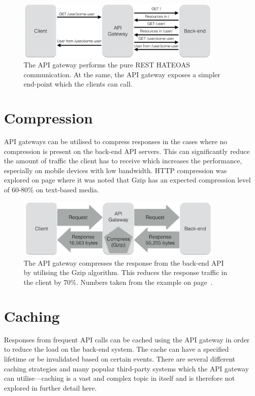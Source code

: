 \documentclass{cslthse-msc}
\begin{document}
\begin{figure}[H]
  \centering
    \begin{center}
      \includegraphics[width=0.9\textwidth]{images/api_gateway_hateoas.png}
    \end{center}
  \caption{The API gateway performs the pure REST HATEOAS communication. At the same, the API gateway exposes a simpler end-point which the clients can call.}
\end{figure}

\section{Compression}
API gateways can be utilised to compress responses in the cases where no compression is present on the back-end API servers. This can significantly reduce the amount of traffic the client has to receive which increases the performance, especially on mobile devices with low bandwidth. HTTP compression was explored on page \pageref{compression} where it was noted that Gzip has an expected compression level of 60-80\% on text-based media.

\begin{figure}[H]
  \centering
    \begin{center}
      \includegraphics[width=0.9\textwidth]{images/api_gateway_compression.png}
    \end{center}
  \caption{The API gateway compresses the response from the back-end API by utilising the Gzip algorithm. This reduces the response traffic in the client by 70\%. Numbers taken from the example on page~\pageref{compression}.}
\end{figure}

\section{Caching}
\label{caching}
Responses from frequent API calls can be cached using the API gateway in order to reduce the load on the back-end system\cite[page 107]{AASG}. The cache can have a specified lifetime or be invalidated based on certain events. There are several different caching strategies and many popular third-party systems which the API gateway can utilise---caching is a vast and complex topic in itself and is therefore not explored in further detail here.
\end{document}
